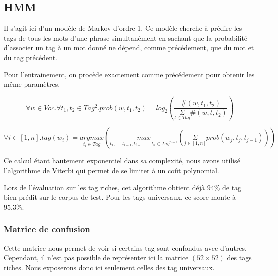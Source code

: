 \documentclass{article}
\begin{document}
\subsection{HMM}

Il s'agit ici d'un modèle de Markov d'ordre 1. Ce modèle cherche à prédire les tags de tous les mots d'une phrase simultanément en sachant que la probabilité d'associer un tag à un mot donné ne dépend, comme précédement, que du mot et du tag précédent.

Pour l'entrainement, on procède exactement comme précédement pour obtenir les même paramètres.

$$\forall w \in Voc . \forall t_1,t_2 \in Tag^2 . prob(w,t_1,t_2) = log_2 \left( \frac{\#(w,t_1,t_2)}{\underset{t \in Tag}{\Sigma}\#(w,t,t_2)} \right) $$



$$\forall i \in [1,n] . tag(w_i) = \underset{t_i \in Tag}{argmax} \left( \underset{t_1,...,t_{i-1},t_{i+1},...,t_n \in Tag^{n-1}}{max} \left( \underset{j \in [1,n]}{\Sigma}            prob(w_j,t_j,t_{j-1})            \right) \right)$$

Ce calcul étant hautement exponentiel dans sa complexité, nous avons utilisé l'algorithme de Viterbi qui permet de se limiter à un coût polynomial.

Lors de l'évaluation sur les tag riches, cet algorithme obtient déjà $94\%$ de tag bien prédit sur le corpus de test. Pour les tags universaux, ce score monte à $95.3\%$. 

\subsubsection{Matrice de confusion}

Cette matrice nous permet de voir si certains tag sont confondus avec d'autres. Cependant, il n'est pas possible de représenter ici la matrice $(52 \times 52)$ des tags riches. Nous exposerons donc ici seulement celles des tag universaux.
\end{document}
